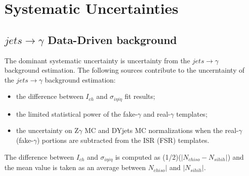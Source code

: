 \section{Systematic Uncertainties}
\label{sec:Systematics}

\subsection{$jets\rightarrow\gamma$ Data-Driven background}

The dominant systematic uncertainty is uncertainty from the $jets\rightarrow\gamma$ background estimation. The following sources contribute to the uncerntainty of  the $jets\rightarrow\gamma$ background estimation:\\

\begin{itemize}
  \item the difference between $I_{ch}$ and $\sigma_{i\eta i\eta}$ fit results;
  \item the limited statistical power of the fake-$\gamma$ and real-$\gamma$ templates;
  \item the uncertainty on Z$\gamma$ MC and DYjets MC normalizations when the real-$\gamma$ (fake-$\gamma$) portions are subtracted from the ISR (FSR) templates. 
\end{itemize}

The difference between $I_{ch}$ and $\sigma_{i\eta i\eta}$ is computed as (1/2)($|N_{chiso}-N_{sihih}|$) and the mean value is taken as an average between $N_{chiso}|$ and $|N_{sihih}|$.

